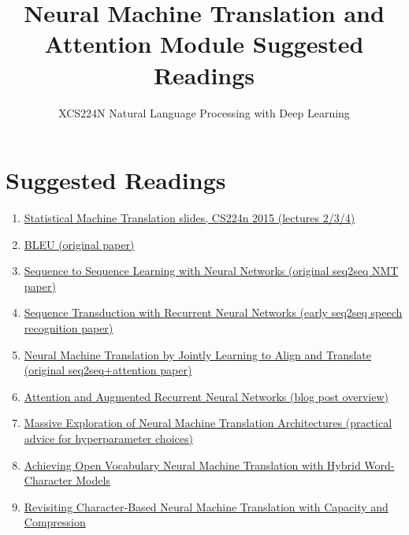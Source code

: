 \documentclass{article}
\title{Neural Machine Translation and Attention Module Suggested Readings}
\author{XCS224N Natural Language Processing with Deep Learning}
\date{}
\begin{document}
\maketitle

\section{Suggested Readings}
\begin{enumerate}
    \item \href{https://web.stanford.edu/class/archive/cs/cs224n/cs224n.1162/syllabus.shtml}{Statistical Machine Translation slides, CS224n 2015 (lectures 2/3/4)}
    \item \href{https://www.aclweb.org/anthology/P02-1040.pdf}{BLEU (original paper)}
    \item \href{https://arxiv.org/pdf/1409.3215.pdf}{Sequence to Sequence Learning with Neural Networks (original seq2seq NMT paper)}
    \item \href{https://arxiv.org/pdf/1211.3711.pdf}{Sequence Transduction with Recurrent Neural Networks (early seq2seq speech recognition paper)}
    \item \href{https://arxiv.org/pdf/1409.0473.pdf}{Neural Machine Translation by Jointly Learning to Align and Translate (original seq2seq+attention paper)}
    \item \href{https://distill.pub/2016/augmented-rnns/}{Attention and Augmented Recurrent Neural Networks (blog post overview)}
    \item \href{https://arxiv.org/pdf/1703.03906.pdf}{Massive Exploration of Neural Machine Translation Architectures (practical advice for hyperparameter choices)}
    \item \href{https://arxiv.org/pdf/1604.00788.pdf}{Achieving Open Vocabulary Neural Machine Translation with Hybrid Word-Character Models}
    \item \href{https://arxiv.org/pdf/1808.09943.pdf}{Revisiting Character-Based Neural Machine Translation with Capacity and Compression}
\end{enumerate}
\end{document}
